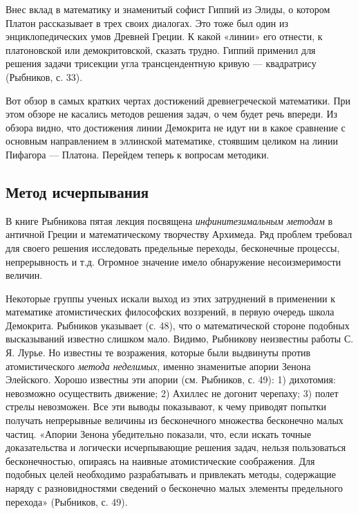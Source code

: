 Внес вклад в математику и знаменитый софист Гиппий из Элиды, о котором
Платон рассказывает в трех своих диалогах. Это тоже был один из
энциклопедических умов Древней Греции. К какой «линии» его отнести, к
платоновской или демокритовской, сказать трудно. Гиппий применил для
решения задачи трисекции угла трансцендентную кривую --- квадратрису
(Рыбников, с. 33).

Вот обзор в самых кратких чертах достижений древнегреческой
математики. При этом обзоре не касались методов решения задач, о чем
будет речь впереди. Из обзора видно, что достижения линии Демокрита не
идут ни в какое сравнение с основным направлением в эллинской
математике, стоявшим целиком на линии Пифагора --- Платона. Перейдем
теперь к вопросам методики.

\subsection{Метод исчерпывания}

В книге Рыбникова пятая лекция посвящена \emph{инфинитезимальным
методам} в античной Греции и математическому творчеству Архимеда. Ряд
проблем требовал для своего решения исследовать предельные переходы,
бесконечные процессы, непрерывность и т.д. Огромное значение имело
обнаружение несоизмеримости величин.

Некоторые группы ученых искали выход из этих затруднений в применении
к математике атомистических философских воззрений, в первую очередь
школа Демокрита. Рыбников указывает (с. 48), что о математической
стороне подобных высказываний известно слишком мало. Видимо, Рыбникову
неизвестны работы С. Я. Лурье. Но известны те возражения, которые были
выдвинуты против атомистического \emph{метода неделимых}, именно
знаменитые апории Зенона Элейского. Хорошо известны эти апории (см.
Рыбников, с. 49): 1) дихотомия: невозможно осуществить движение; 2)
Ахиллес не догонит черепаху; 3) полет стрелы невозможен. Все эти
выводы показывают, к чему приводят попытки получать непрерывные
величины из бесконечного множества бесконечно малых частиц. «Апории
Зенона убедительно показали, что, если искать точные доказательства и
логически исчерпывающие решения задач, нельзя пользоваться
бесконечностью, опираясь на наивные атомистические соображения. Для
подобных целей необходимо разрабатывать и привлекать методы,
содержащие наряду с разновидностями сведений о бесконечно малых
элементы предельного перехода» (Рыбников, с. 49).

